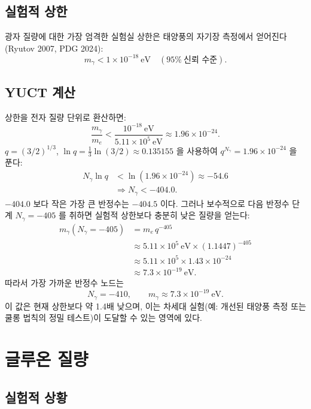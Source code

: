\documentclass[11pt,a4paper]{article}
\begin{document}
	\subsection{실험적 상한}
	
	광자 질량에 대한 가장 엄격한 실험실 상한은 태양풍의 자기장 측정에서 얻어진다 (Ryutov 2007, PDG 2024):
	\begin{equation}\label{eq:photonlimit}
		m_\gamma < 1 \times 10^{-18}~\mathrm{eV} \quad (95\%~\text{신뢰 수준}).
	\end{equation}
	
	\subsection{YUCT 계산}
	
	상한을 전자 질량 단위로 환산하면:
	\[
	\frac{m_\gamma}{m_e} < \frac{10^{-18}~\mathrm{eV}}{5.11\times 10^5~\mathrm{eV}}
	\approx 1.96 \times 10^{-24}.
	\]
	$q = (3/2)^{1/3}$, $\ln q = \tfrac13\ln(3/2) \approx 0.135155$ 을 사용하여 $q^{N_\gamma} = 1.96\times10^{-24}$ 을 푼다:
	\[
	\begin{aligned}
		N_\gamma \ln q &< \ln(1.96\times10^{-24}) \approx -54.6 \\
		&\Longrightarrow N_\gamma < -404.0 .
	\end{aligned}
	\]
	$-404.0$ 보다 작은 가장 큰 반정수는 $-404.5$ 이다. 그러나 보수적으로 다음 반정수 단계 $N_\gamma = -405$ 를 취하면 실험적 상한보다 충분히 낮은 질량을 얻는다:
	\[
	\begin{aligned}
		m_\gamma(N_\gamma = -405) &= m_e \, q^{-405} \\
		&\approx 5.11\times10^5~\mathrm{eV} \times (1.1447)^{-405} \\
		&\approx 5.11\times10^5 \times 1.43\times10^{-24} \\
		&\approx 7.3 \times 10^{-19}~\mathrm{eV}.
	\end{aligned}
	\]
	따라서 가장 가까운 반정수 노드는
	\[
	\boxed{N_\gamma = -410}, \qquad
	\boxed{m_\gamma \approx 7.3 \times 10^{-19}~\mathrm{eV}} .
	\]
	이 값은 현재 상한보다 약 1.4배 낮으며, 이는 차세대 실험(예: 개선된 태양풍 측정 또는 쿨롱 법칙의 정밀 테스트)이 도달할 수 있는 영역에 있다.
	
	\section{글루온 질량}
	
	\subsection{실험적 상황}
	
\end{document}
